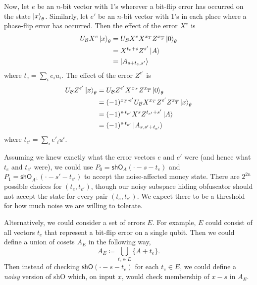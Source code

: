 \documentclass[12pt,letterpaper]{article}
\theoremstyle{definition}
\theoremstyle{remark}
\begin{document}
Now, let $e$ be an $n$-bit vector with 1's wherever a bit-flip error has occurred on the state $\ket{x}_\theta$. Similarly, let $e'$ be an $n$-bit vector with 1's in each place where a phase-flip error has occurred. Then the effect of the error $X^e$ is
\begin{align*}
    U_{\mathcal{B}} X^e \ket{x}_\theta &= U_{\mathcal{B}} X^e X^{x_T} Z^{x_{\overline{T}}} \ket{0}_\theta\\
    &= X^{t_e + s} Z^{s'} \ket{A}\\
    &= \ket{A_{s+t_e,s'}}
\end{align*}
where $t_e = \sum_i e_i u_i$. The effect of the error $Z^{e'}$ is
\begin{align*}
    U_{\mathcal{B}} Z^{e'} \ket{x}_\theta &= U_{\mathcal{B}} Z^{e'} X^{x_T} Z^{x_{\overline{T}}} \ket{0}_\theta\\
    &= (-1)^{x_T \cdot e'}U_{\mathcal{B}}X^{x_T}Z^{e'}Z^{x_{\overline{T}}}\ket{x}_\theta\\
    &= (-1)^{s \cdot t_{e'}} X^{s} Z^{t_{e'}+s'} \ket{A}\\
    &= (-1)^{s \cdot t_{e'}} \ket{A_{s,s'+t_{e'}}}
\end{align*}
where $t_{e'}=\sum_i e'_i u^i$.

Assuming we knew exactly what the error vectors $e$ and $e'$ were (and hence what $t_e$ and $t_{e'}$ were), we could use $P_0=\textsf{shO}_A(\cdot-s-t_e)$ and $P_1 = \textsf{shO}_{A^\perp}(\cdot-s'-t_{e'})$ to accept the noise-affected money state. There are $2^{2n}$ possible choices for $(t_e,t_{e'})$, though our noisy subspace hiding obfuscator should not accept the state for every pair $(t_e,t_{e'})$. We expect there to be a threshold for how much noise we are willing to tolerate.

Alternatively, we could consider a set of errors $E$. For example, $E$ could consist of all vectors $t_e$ that represent a bit-flip error on a single qubit. Then we could define a union of cosets $A_E$ in the following way,
\begin{equation*}
    A_E \coloneqq \bigcup_{t_e \in E} \{A+t_e\}.
\end{equation*}
Then instead of checking $\textsf{shO}(\cdot-s-t_e)$ for each $t_e \in E$, we could define a \emph{noisy} version of \textsf{shO} which, on input $x$, would check membership of $x-s$ in $A_E$.
\end{document}
